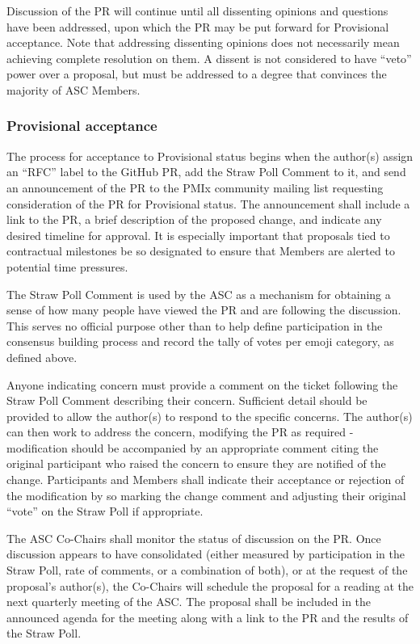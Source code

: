 \documentclass{article}
\begin{document}
Discussion of the PR will continue until all dissenting opinions and
questions have been addressed, upon which the PR may be put forward for
Provisional acceptance. Note that addressing dissenting opinions does
not necessarily mean achieving complete resolution on them. A dissent is
not considered to have ``veto'' power over a proposal, but must be
addressed to a degree that convinces the majority of ASC Members.

\hypertarget{provisional-acceptance}{%
\subsubsection{Provisional acceptance}\label{provisional-acceptance}}

The process for acceptance to Provisional status begins when the
author(s) assign an ``RFC'' label to the GitHub PR, add the
Straw Poll Comment to it, and send an announcement of the
PR to the PMIx community mailing list requesting consideration of the PR
for Provisional status. The announcement shall include a link to the PR,
a brief description of the proposed change, and indicate any desired
timeline for approval. It is especially important that proposals tied to
contractual milestones be so designated to ensure that Members are
alerted to potential time pressures.

The Straw Poll Comment is used by the ASC as a mechanism for
obtaining a sense of how many people have viewed the PR and are
following the discussion. This serves no official purpose other than to
help define participation in the consensus building process and record
the tally of votes per emoji category, as defined above.

Anyone indicating concern must provide a comment on the ticket following
the Straw Poll Comment describing their concern. Sufficient
detail should be provided to allow the author(s) to respond to the
specific concerns. The author(s) can then work to address the concern,
modifying the PR as required - modification should be accompanied by an
appropriate comment citing the original participant who raised the
concern to ensure they are notified of the change. Participants and
Members shall indicate their acceptance or rejection of the modification
by so marking the change comment and adjusting their original ``vote''
on the Straw Poll if appropriate.

The ASC Co-Chairs shall monitor the status of discussion on the PR. Once
discussion appears to have consolidated (either measured by
participation in the Straw Poll, rate of comments, or a combination of
both), or at the request of the proposal's author(s), the Co-Chairs will
schedule the proposal for a reading at the next quarterly meeting of the
ASC. The proposal shall be included in the announced agenda for the
meeting along with a link to the PR and the results of the Straw Poll.
\end{document}
